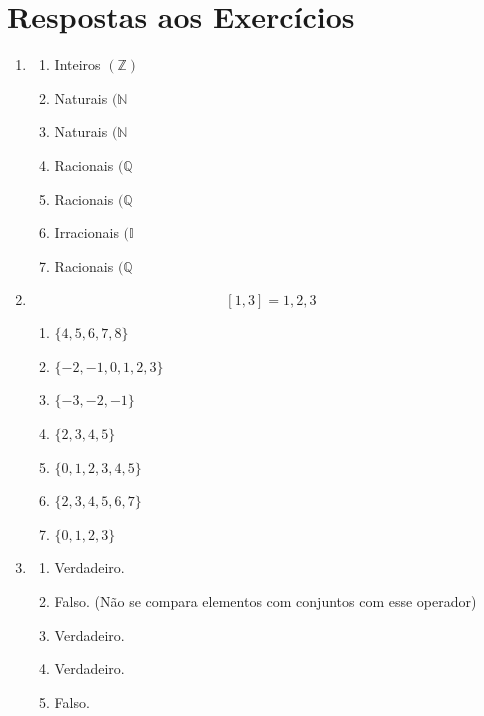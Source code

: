 \documentclass[11pt]{article}
\begin{document}
\newpage

\section{Respostas aos Exercícios}
\begin{enumerate}
	\item
	\begin{enumerate}
		\item Inteiros $(\mathbb{Z})$
		\item Naturais $(\mathbb{N}$
		\item Naturais $(\mathbb{N}$
		\item Racionais $(\mathbb{Q}$
		\item Racionais $(\mathbb{Q}$
		\item Irracionais $(\mathbb{I}$
		\item Racionais $(\mathbb{Q}$
	\end{enumerate}

	\item
		  $$[1,3] = 1,2,3$$
	\begin{enumerate}
		\item $\{4,5,6,7,8\}$
		\item $\{-2,-1,0,1,2,3\}$
		\item $\{-3,-2,-1\}$
		\item $\{2,3,4,5\}$
		\item $\{0,1,2,3,4,5\}$
		\item $\{2,3,4,5,6,7\}$
		\item $\{0,1,2,3\}$
	\end{enumerate}

	\item 
	\begin{enumerate}
		\item Verdadeiro.
		\item Falso. (Não se compara elementos com conjuntos com esse operador)
		\item Verdadeiro.
		\item Verdadeiro.
		\item Falso.
	\end{enumerate}
\end{enumerate}
\end{document}
